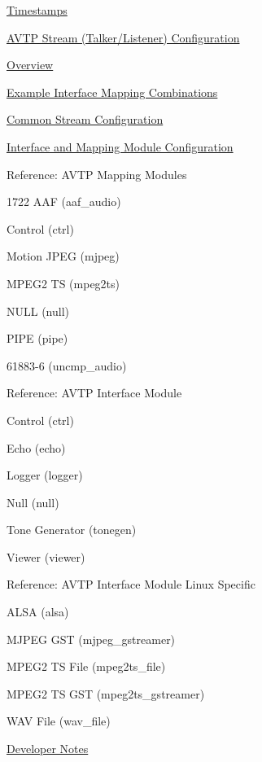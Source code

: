 \begin{DoxyItemize}
\begin{DoxyItemize}
\item \hyperlink{sdk_avtp_interface_module_dev_sdk_avtp_intf_module_timestamps}{Timestamps}
\end{DoxyItemize}
\item \hyperlink{sdk_avtp_stream_cfg}{A\+V\+TP Stream (Talker/\+Listener) Configuration}
\begin{DoxyItemize}
\item \hyperlink{sdk_avtp_stream_cfg_sdk_avtp_stream_cfg_overview}{Overview}
\item \hyperlink{sdk_avtp_stream_cfg_sdk_avtp_stream_cfg_combinations}{Example Interface Mapping Combinations}
\item \hyperlink{sdk_avtp_stream_cfg_sdk_avtp_stream_cfg_common}{Common Stream Configuration}
\item \hyperlink{sdk_avtp_stream_cfg_sdk_avtp_stream_cfg_intf_map}{Interface and Mapping Module Configuration}
\item Reference\+: A\+V\+TP Mapping Modules
\begin{DoxyItemize}
\item 1722 A\+AF (aaf\+\_\+audio)
\item Control (ctrl)
\item Motion J\+P\+EG (mjpeg)
\item M\+P\+E\+G2 TS (mpeg2ts)
\item N\+U\+LL (null)
\item P\+I\+PE (pipe)
\item 61883-\/6 (uncmp\+\_\+audio)
\end{DoxyItemize}
\item Reference\+: A\+V\+TP Interface Module
\begin{DoxyItemize}
\item Control (ctrl)
\item Echo (echo)
\item Logger (logger)
\item Null (null)
\item Tone Generator (tonegen)
\item Viewer (viewer)
\end{DoxyItemize}
\item Reference\+: A\+V\+TP Interface Module Linux Specific
\begin{DoxyItemize}
\item A\+L\+SA (alsa)
\item M\+J\+P\+EG G\+ST (mjpeg\+\_\+gstreamer)
\item M\+P\+E\+G2 TS File (mpeg2ts\+\_\+file)
\item M\+P\+E\+G2 TS G\+ST (mpeg2ts\+\_\+gstreamer)
\item W\+AV File (wav\+\_\+file)
\end{DoxyItemize}
\end{DoxyItemize}
\item \hyperlink{sdk_notes}{Developer Notes} 
\end{DoxyItemize}